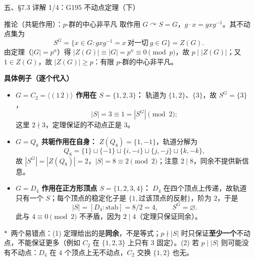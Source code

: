 \documentclass[aspectratio=169,10pt,fontset=none]{ctexbeamer}
\newcommand{\key}[1]{\textcolor{ink}{\bfseries #1}}
\newcommand{\starpt}{\textcolor{accent}{\bfseries$\ast$}}
\begin{document}
\begin{frame}[t]{五、\S7.3 详解 1/4：G195 不动点定理（下）}
\begin{block}{\footnotesize 推论（共轭作用）：$p$-群的中心非平凡}
\scriptsize
取作用 $G\curvearrowright S=G$，$g\cdot x=gxg^{-1}$。其不动点集为
\[ S^G=\{x\in G: gxg^{-1}=x\ \text{对一切}\ g\in G\}=Z(G). \]
由定理（$|G|=p^n$）得 $|Z(G)|\equiv |G|=p^n\equiv0\pmod p$，故 $p\mid |Z(G)|$；又 $1\in Z(G)$，故 $|Z(G)|\ge p$：有限 $p$-群的中心非平凡。
\end{block}
{\footnotesize\key{具体例子（逐个代入）}\par}
\begin{itemize}\setlength{\itemsep}{0pt}
\scriptsize
\item \textbf{$G=C_2=\langle(1\,2)\rangle$ 作用在 $S=\{1,2,3\}$：} 轨道为 $\{1,2\}$、$\{3\}$，故 $S^G=\{3\}$，
\[ |S|=3\equiv1=|S^G|\pmod2; \]
这里 $2\nmid3$，定理保证的不动点正是 $3$。
\item \textbf{$G=Q_8$ 共轭作用在自身：} $Z(Q_8)=\{1,-1\}$，轨道分解为
\[ Q_8=\{1\}\sqcup\{-1\}\sqcup\{i,-i\}\sqcup\{j,-j\}\sqcup\{k,-k\}, \]
故 $|S^G|=|Z(Q_8)|=2$，$|S|=8\equiv2\pmod2$；注意 $2\mid8$，同余不提供新信息。
\item \textbf{$G=D_4$ 作用在正方形顶点 $S=\{1,2,3,4\}$：} $D_4$ 在四个顶点上传递，故轨道只有一个 $S$；每个顶点的稳定化子是 $\{1,\text{过该顶点的反射}\}$，阶为 $2$，于是
\[ |S|=[D_4:\text{stab}]=8/2=4,\qquad S^G=\varnothing. \]
此与 $4\equiv0\pmod2$ 不矛盾，因为 $2\mid4$（定理只保证同余）。
\end{itemize}
{\footnotesize\color{ink!80}\starpt\ 两个易错点：(1) 定理给出的是\textbf{同余}，不是等式；$p\nmid|S|$ 时只保证\textbf{至少一个}不动点，不能保证更多（例如 $C_2$ 在 $\{1,2,3\}$ 上只有 $3$ 固定）。(2) 若 $p\mid|S|$ 则可能没有不动点：$D_4$ 在 $4$ 个顶点上无不动点，$C_2$ 交换 $\{1,2\}$ 也无。\par}
\end{frame}
\end{document}

